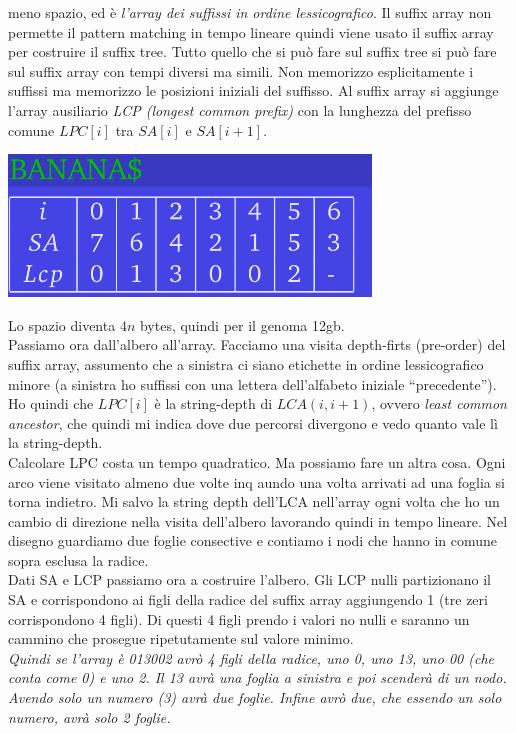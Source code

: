 \documentclass[a4paper,12pt, oneside]{book}
\begin{document}
meno spazio, ed è \textit{l'array dei suffissi in ordine
  lessicografico}. Il suffix array non permette il pattern matching in
tempo lineare quindi viene usato il suffix array per costruire il
suffix tree. Tutto quello che si può fare sul suffix tree si può fare
sul suffix array con tempi diversi ma simili. Non memorizzo
esplicitamente i suffissi ma memorizzo le posizioni iniziali del
suffisso. Al suffix array si aggiunge l'array ausiliario \textit{LCP
  (longest  common prefix)} con la lunghezza del prefisso comune $LPC[i]$
tra $SA[i]$ e $SA[i+1]$.
\begin{center}
  \includegraphics[scale = 0.5]{img/suf2.png}
\end{center}
Lo spazio diventa $4n$ bytes, quindi per il genoma 12gb.\\
Passiamo ora dall'albero all'array. Facciamo una visita depth-firts
(pre-order) del suffix array, assumento che a sinistra ci siano
etichette in ordine lessicografico minore (a sinistra ho suffissi con
una lettera dell'alfabeto iniziale ``precedente'').\\
Ho quindi che $LPC[i]$ è la string-depth di $LCA(i, i+1)$, ovvero
\textit{least common ancestor}, che quindi mi indica dove due percorsi
divergono e vedo quanto vale lì la string-depth.\\
Calcolare LPC costa un tempo quadratico. Ma possiamo fare un altra
cosa. Ogni arco viene visitato almeno due volte inq aundo una volta arrivati
ad una foglia si torna indietro. Mi salvo la string depth dell'LCA
nell'array ogni volta che ho un cambio di direzione nella visita dell'albero
lavorando quindi in tempo lineare. Nel disegno guardiamo due foglie
consective e contiamo i nodi che hanno in comune sopra esclusa la radice.\\
Dati SA e LCP passiamo ora a costruire l'albero. Gli LCP nulli
partizionano il SA e corrispondono ai figli della radice del suffix
array aggiungendo 1 (tre zeri corrispondono 4 figli). Di questi 4
figli prendo i valori no nulli e saranno un cammino che prosegue
ripetutamente sul valore minimo.\\
\textit{Quindi se l'array è 013002 avrò 4 figli della radice, uno 0, uno 13,
  uno 00 (che conta come 0) e uno 2. Il 13 avrà una foglia a sinistra e
  poi scenderà di un nodo. Avendo solo un numero (3) avrà due
  foglie. Infine avrò due, che essendo un solo numero, avrà solo 2
  foglie.}\\
\end{document}
